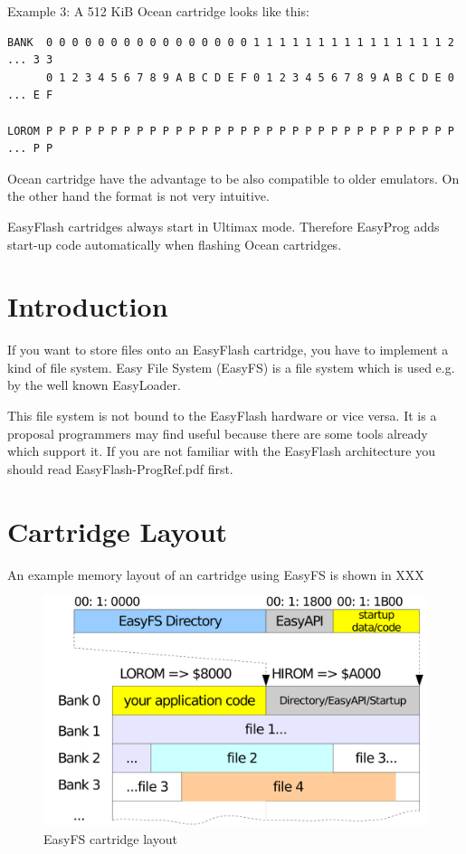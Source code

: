 \documentclass[a4paper,oneside]{memoir}
\begin{document}
Example 3: A 512 KiB Ocean cartridge looks like this:

\footnotesize
\begin{verbatim}
BANK  0 0 0 0 0 0 0 0 0 0 0 0 0 0 0 0 1 1 1 1 1 1 1 1 1 1 1 1 1 1 1 2 ... 3 3
      0 1 2 3 4 5 6 7 8 9 A B C D E F 0 1 2 3 4 5 6 7 8 9 A B C D E 0 ... E F

LOROM P P P P P P P P P P P P P P P P P P P P P P P P P P P P P P P P ... P P
\end{verbatim}
\normalsize

Ocean cartridge have the advantage to be also compatible to older emulators. On
the other hand the format is not very intuitive.

EasyFlash cartridges always start in Ultimax mode. Therefore EasyProg adds
start-up code automatically when flashing Ocean cartridges.

\section{Introduction}

If you want to store files onto an EasyFlash cartridge, you have to implement a
kind of file system. Easy File System (EasyFS) is a file system which is used
e.g. by the well known EasyLoader.

This file system is not bound to the EasyFlash hardware or vice versa. It is a
proposal programmers may find useful because there are some tools already which
support it. If you are not familiar with the EasyFlash architecture you should
read EasyFlash-ProgRef.pdf first.

\section{Cartridge Layout}
An example memory layout of an cartridge using EasyFS is shown in XXX

\begin{figure}[!htbp]
    \centering
    \includegraphics[scale=1.0]{src/easyfs.pdf}
    \caption{EasyFS cartridge layout}
    \label{fig:easyfs}
\end{figure}
\end{document}
